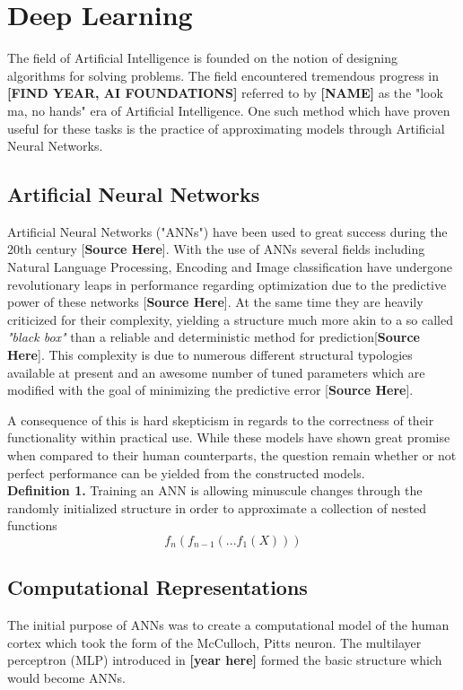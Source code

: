 \section{Deep Learning}

The field of Artificial Intelligence is founded on the notion of designing algorithms for solving problems. The field encountered tremendous progress in \textbf{[FIND YEAR, AI FOUNDATIONS]} referred to by \textbf{[NAME]} as the "look ma, no hands" era of Artificial Intelligence. One such method which have proven useful for these tasks is the practice of approximating models through Artificial Neural Networks.

\subsection{Artificial Neural Networks}
Artificial Neural Networks ("ANNs") have been used to great success during the 20th century [\textbf{Source Here}]. With the use of ANNs
several fields including Natural Language Processing, Encoding and Image classification have undergone revolutionary leaps in performance regarding optimization due to the predictive power of these networks [\textbf{Source Here}]. At the same time they are heavily criticized for their complexity, yielding a structure much more akin to a so called \textit{"black box"} than a reliable and deterministic method for prediction[\textbf{Source Here}]. This complexity is due to numerous different structural typologies available at present and an awesome number of tuned parameters which are modified with the goal of minimizing the predictive error [\textbf{Source Here}].

A consequence of this is hard skepticism in regards to the correctness of their functionality within practical use. While these models have shown great promise when compared to their human counterparts, the question remain whether or not perfect performance can be yielded from the constructed models.\\

\textbf{Definition 1.} Training an ANN is allowing minuscule changes through the randomly initialized structure in order to approximate a collection of nested functions $$f_n(f_{n-1}(...f_1(X)))$$ 

\subsection{Computational Representations}
The initial purpose of ANNs was to create a computational model of the human cortex which took the form of the McCulloch, Pitts neuron. The multilayer perceptron (MLP) introduced in \textbf{[year here]} formed the basic structure which would become ANNs. 


